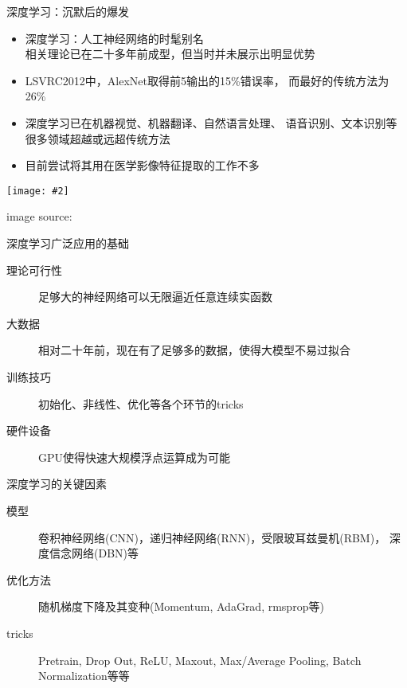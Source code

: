 \documentclass {beamer}
\newcommand{\addgraph}[2]{\begin{center}
\texttt{[image: \#2]}\end{center}}
\begin{document}
\begin{frame}{深度学习：沉默后的爆发}
    \begin{itemize}
        \item 深度学习：人工神经网络的时髦别名\\
            相关理论已在二十多年前成型，但当时并未展示出明显优势
        \item LSVRC2012中，AlexNet取得前5输出的15\%错误率，
            而最好的传统方法为26\%
        \item 深度学习已在机器视觉、机器翻译、自然语言处理、
            语音识别、文本识别等很多领域超越或远超传统方法
        \item 目前尝试将其用在医学影像特征提取的工作不多
    \end{itemize}

    \addgraph{0.5}{res/alexnet.png}
    \tiny{image source: \cite{krizhevsky2012imagenet}}
\end{frame}

\begin{frame}{深度学习广泛应用的基础}
    \begin{description}
        \item[理论可行性] 足够大的神经网络可以无限逼近任意连续实函数
        \item[大数据] 相对二十年前，现在有了足够多的数据，使得大模型不易过拟合
        \item[训练技巧] 初始化、非线性、优化等各个环节的tricks
        \item[硬件设备] GPU使得快速大规模浮点运算成为可能
    \end{description}
\end{frame}

\begin{frame}{深度学习的关键因素}
    \begin{description}
        \item[模型] 卷积神经网络(CNN)，递归神经网络(RNN)，受限玻耳兹曼机(RBM)，
            深度信念网络(DBN)等
        \item[优化方法] 随机梯度下降及其变种(Momentum, AdaGrad, rmsprop等)
        \item[tricks] Pretrain, Drop Out, ReLU, Maxout,
            Max/Average Pooling, Batch Normalization等等
    \end{description}
\end{frame}
\end{document}
